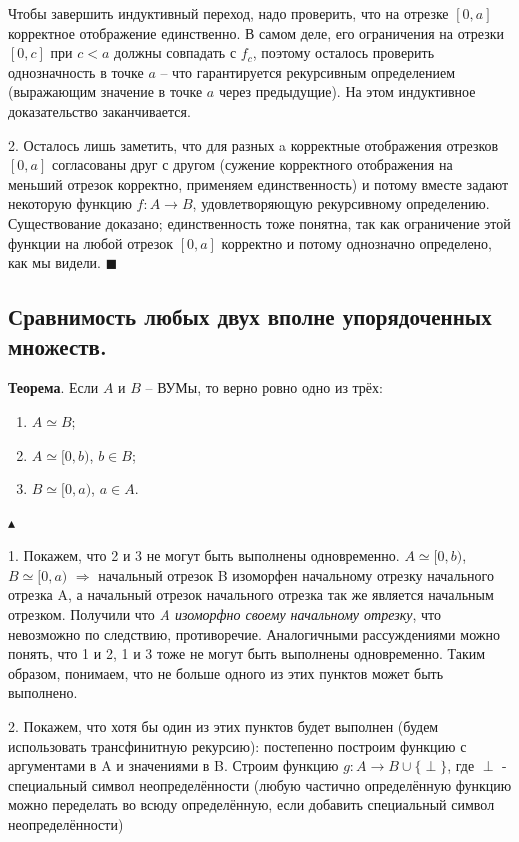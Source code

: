 Чтобы завершить индуктивный переход, надо проверить, что на отрезке $[0, a]$ корректное отображение единственно. В самом деле, его ограничения на отрезки $[0, c]$ при $c < a$ должны совпадать с $f_c$, поэтому осталось проверить однозначность в точке $a$ -- что гарантируется рекурсивным определением (выражающим значение в точке $a$ через предыдущие). На этом индуктивное доказательство заканчивается.

2. Осталось лишь заметить, что для разных a корректные отображения отрезков $[0, a]$ согласованы друг с другом (сужение корректного отображения на меньший отрезок корректно, применяем единственность) и потому вместе задают некоторую функцию $f : A \rightarrow B$, удовлетворяющую рекурсивному определению. Существование доказано; единственность тоже понятна, так как ограничение этой функции на любой отрезок $[0, a]$ корректно и потому однозначно определено, как мы видели. $\blacksquare$

\subsection{Сравнимость любых двух вполне упорядоченных множеств.}

\textbf{Теорема}. Если $A$ и $B$ -- ВУМы, то верно ровно одно из трёх:

\begin{enumerate}
    \item $A \simeq B$;
    \item $A \simeq [0, b)$, $b \in B$;
    \item $B \simeq [0, a)$, $a \in A$.
\end{enumerate}

$\blacktriangle$

1. Покажем, что 2 и 3 не могут быть выполнены одновременно. $A \simeq [0, b)$, $B \simeq [0, a)$  $\Rightarrow$ начальный отрезок B изоморфен начальному отрезку начального отрезка A, а начальный отрезок начального отрезка так же является начальным отрезком. Получили что \emph{A изоморфно своему начальному отрезку}, что невозможно по следствию, противоречие. Аналогичными рассуждениями можно понять, что 1 и 2, 1 и 3 тоже не могут быть выполнены одновременно. 
Таким образом, понимаем, что не больше одного из этих пунктов может быть выполнено. 

2. Покажем, что хотя бы один из этих пунктов будет выполнен (будем использовать трансфинитную рекурсию): постепенно построим функцию с аргументами в A и значениями в B. Строим функцию $g: A  \rightarrow B \cup\{\perp\}$, где $\perp$ - специальный символ неопределённости (любую частично определённую функцию можно переделать во всюду определённую, если добавить специальный символ неопределённости)

